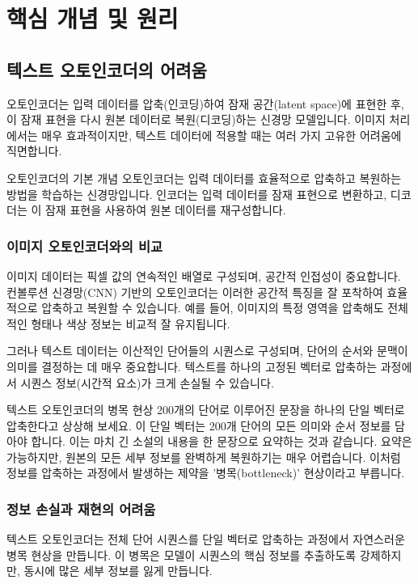 \documentclass[11pt,a4paper]{article}
\begin{document}
\newpage
\section*{핵심 개념 및 원리}

\subsection{텍스트 오토인코더의 어려움}
오토인코더는 입력 데이터를 압축(인코딩)하여 잠재 공간(latent space)에 표현한 후, 이 잠재 표현을 다시 원본 데이터로 복원(디코딩)하는 신경망 모델입니다. 이미지 처리에서는 매우 효과적이지만, 텍스트 데이터에 적용할 때는 여러 가지 고유한 어려움에 직면합니다.

\begin{definitionbox}{오토인코더의 기본 개념}
오토인코더는 입력 데이터를 효율적으로 압축하고 복원하는 방법을 학습하는 신경망입니다. 인코더는 입력 데이터를 잠재 표현으로 변환하고, 디코더는 이 잠재 표현을 사용하여 원본 데이터를 재구성합니다.
\end{definitionbox}

\subsubsection{이미지 오토인코더와의 비교}
이미지 데이터는 픽셀 값의 연속적인 배열로 구성되며, 공간적 인접성이 중요합니다. 컨볼루션 신경망(CNN) 기반의 오토인코더는 이러한 공간적 특징을 잘 포착하여 효율적으로 압축하고 복원할 수 있습니다. 예를 들어, 이미지의 특정 영역을 압축해도 전체적인 형태나 색상 정보는 비교적 잘 유지됩니다.

그러나 텍스트 데이터는 이산적인 단어들의 시퀀스로 구성되며, 단어의 순서와 문맥이 의미를 결정하는 데 매우 중요합니다. 텍스트를 하나의 고정된 벡터로 압축하는 과정에서 시퀀스 정보(시간적 요소)가 크게 손실될 수 있습니다.

\begin{examplebox}{텍스트 오토인코더의 병목 현상}
200개의 단어로 이루어진 문장을 하나의 단일 벡터로 압축한다고 상상해 보세요. 이 단일 벡터는 200개 단어의 모든 의미와 순서 정보를 담아야 합니다. 이는 마치 긴 소설의 내용을 한 문장으로 요약하는 것과 같습니다. 요약은 가능하지만, 원본의 모든 세부 정보를 완벽하게 복원하기는 매우 어렵습니다. 이처럼 정보를 압축하는 과정에서 발생하는 제약을 '병목(bottleneck)' 현상이라고 부릅니다.
\end{examplebox}

\subsubsection{정보 손실과 재현의 어려움}
텍스트 오토인코더는 전체 단어 시퀀스를 단일 벡터로 압축하는 과정에서 자연스러운 병목 현상을 만듭니다. 이 병목은 모델이 시퀀스의 핵심 정보를 추출하도록 강제하지만, 동시에 많은 세부 정보를 잃게 만듭니다.
\end{document}
